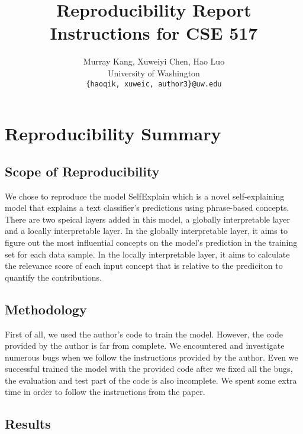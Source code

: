 \documentclass{article}
\title{Reproducibility Report Instructions for CSE 517}
\author{%
  Murray Kang, Xuweiyi Chen, Hao Luo \\ %
  University of Washington \\
 \texttt{\{haoqik, xuweic, author3\}@uw.edu} \\ %
}
\begin{document}
\maketitle



\section*{\centering Reproducibility Summary}


\subsection*{Scope of Reproducibility}

We chose to reproduce the model SelfExplain which is a novel self-explaining model that explains a text classifier's predictions using phrase-based concepts. There are two speical layers added in this model, a globally interpretable layer and a locally interpretable layer. In the globally interpretable layer, it aims to figure out the most influential concepts on the model's prediction in the training set for each data sample. In the locally interpretable layer, it aims to calculate the relevance score of each input concept that is relative to the prediciton to quantify the contributions.

\subsection*{Methodology}

First of all, we used the author's code to train the model. However, the code provided by 
the author is far from complete. We encountered and investigate numerous bugs when we follow
the instructions provided by the author. Even we successful trained the model with the provided 
code after we fixed all the bugs, the evaluation and test part of the code is also incomplete. 
We spent some extra time in order to follow the instructions from the paper.

\subsection*{Results}
\end{document}
